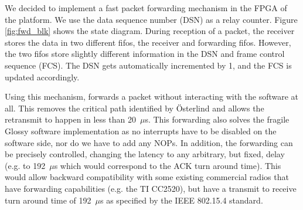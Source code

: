 We decided to implement a fast packet forwarding mechanism in the FPGA of the
\sdr platform. We use the data sequence number (DSN) as a relay counter.
Figure \ref{fig:fwd_blk} shows the state diagram. During reception of a
packet, the receiver stores the data in two different fifos, the receiver and
forwarding fifos. However, the two fifos store slightly different information
in the DSN and frame control sequence (FCS). The DSN gets automatically
incremented by 1, and the FCS is updated accordingly.

Using this mechanism, \sdr forwards a packet without interacting with the
software at all. This removes the critical path identified by \"{O}sterlind
and allows the retransmit to happen in less than 20~$\mu$s. This forwarding
also solves the fragile Glossy software implementation as no interrupts have
to be disabled on the software side, nor do we have to add any NOPs. In
addition, the forwarding can be precisely controlled, changing the latency to
any arbitrary, but fixed, delay (e.g. to 192~$\mu$s which would correspond to
the ACK turn around time). This would allow backward compatibility with some
existing commercial radios that have forwarding capabilities (e.g. the TI
CC2520), but have a transmit to receive turn around time of 192~$\mu$s as
specified by the IEEE 802.15.4 standard.

